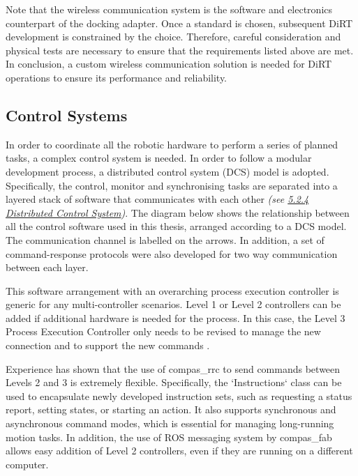 Note that the wireless communication system is the software and electronics counterpart of the docking adapter. Once a standard is chosen, subsequent DiRT development is constrained by the choice. Therefore, careful consideration and physical tests are necessary to ensure that the requirements listed above are met. In conclusion, a custom wireless communication solution is needed for DiRT operations to ensure its performance and reliability.

\subsection{Control Systems}
\label{subsection:discussion_control_systems}

In order to coordinate all the robotic hardware to perform a series of planned tasks, a complex control system is needed. In order to follow a modular development process, a distributed control system (DCS) model is adopted. Specifically, the control, monitor and synchronising tasks are separated into a layered stack of software that communicates with each other \textit{(see \ul{5.2.4 Distributed Control System})}. The diagram below shows the relationship between all the control software used in this thesis, arranged according to a DCS model. The communication channel is labelled on the arrows. In addition, a set of command-response protocols were also developed for two way communication between each layer. 



This software arrangement with an overarching process execution controller is generic for any multi-controller scenarios. Level 1 or Level 2 controllers can be added if additional hardware is needed for the process. In this case, the Level 3 Process Execution Controller only needs to be revised to manage the new connection and to support the new commands . 

Experience has shown that the use of compas\_rrc \parencite{fleischmannCOMPASRRCOnline2020} to send commands between Levels 2 and 3 is extremely flexible. Specifically, the `Instructions` class can be used to encapsulate newly developed instruction sets, such as requesting a status report, setting states, or starting an action. It also supports synchronous and asynchronous command modes, which is essential for managing long-running motion tasks. In addition, the use of ROS messaging system by compas\_fab allows easy addition of Level 2 controllers, even if they are running on a different computer. 


